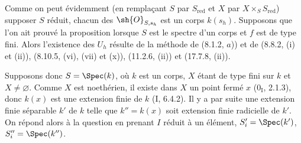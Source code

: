 Comme on peut évidemment (en remplaçant $S$ par $S_{\mathrm{red}}$ et $X$ par $X\times_S S_{\mathrm{red}}$) supposer $S$ réduit, chacun des $\sh{O}_{S,s_h}$ est un corps $k(s_h)$. Supposons que l'on ait prouvé la proposition lorsque $S$ est le spectre d'un corps et $f$ est de type fini. Alors l'existence des $U_h$ résulte de la méthode de (8.1.2, $a$)) et de (8.8.2, (i) et (ii)), (8.10.5, (vi), (vii) et (x)), (11.2.6, (ii)) et (17.7.8, (ii)).

Supposons donc $S=\Spec(k)$, où $k$ est un corps, $X$ étant de type fini sur $k$ et $X\neq\varnothing$. Comme $X$ est noethérien, il existe dans $X$ un point fermé $x$ ($0_{\mathrm I}$, 2.1.3), donc $k(x)$ est une extension finie de $k$ (I, 6.4.2). Il y a par suite une extension finie séparable $k'$ de $k$ telle que $k''=k(x)$ soit extension finie radicielle de $k'$. On répond alors à la question en prenant $I$ réduit à un élément, $S_i'=\Spec(k')$, $S_i''=\Spec(k'')$.


